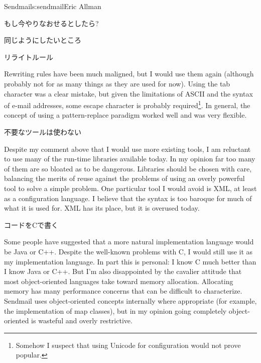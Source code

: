 \begin{aosachapter}{Sendmail}{s:sendmail}{Eric Allman}
\begin{aosasect1}{もし今やりなおせるとしたら?}
\begin{aosasect2}{同じようにしたいところ}
\begin{aosasect3}{リライトルール}

Rewriting rules have been much maligned, but I would use them again
(although probably not for as many things as they are used for now).
Using the tab character was a clear mistake, but given the limitations
of ASCII and the syntax of e-mail addresses, some escape character is
probably required\footnote{Somehow I suspect that using Unicode for
configuration would not prove popular.}. In general, the concept of
using a pattern-replace paradigm worked well and was very flexible.

\end{aosasect3}

\begin{aosasect3}{不要なツールは使わない}

Despite my comment above that I would use more existing tools, I am
reluctant to use many of the run-time libraries available today. In my
opinion far too many of them are so bloated as to be dangerous.
Libraries should be chosen with care, balancing the merits of reuse
against the problems of using an overly powerful tool to solve a
simple problem. One particular tool I would avoid is XML, at least as
a configuration language. I believe that the syntax is too baroque for
much of what it is used for. XML has its place, but it is overused
today.

\end{aosasect3}

\begin{aosasect3}{コードをCで書く}

Some people have suggested that a more natural implementation language
would be Java or C++. Despite the well-known problems with C, I would
still use it as my implementation language. In part this is personal:
I know C much better than I know Java or C++. But I'm also
disappointed by the cavalier attitude that most object-oriented
languages take toward memory allocation. Allocating memory has many
performance concerns that can be difficult to characterize.  Sendmail
uses object-oriented concepts internally where appropriate (for
example, the implementation of map classes), but in my opinion going
completely object-oriented is wasteful and overly restrictive.


\end{aosasect3}
\end{aosasect2}
\end{aosasect1}
\end{aosachapter}
